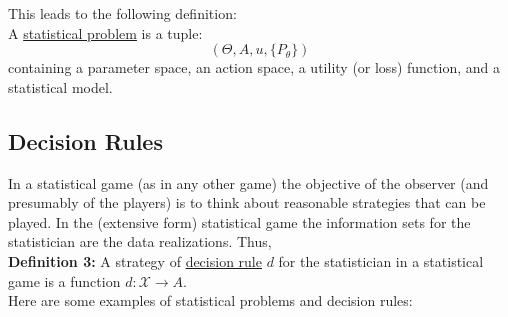 \documentclass[11pt]{article} %
\begin{document}
This leads to the following definition:\\

 A \underline{statistical problem} is a tuple: 
\[(\Theta, A, u, \{P_{\theta}\})\] 
containing a parameter space, an action space, a utility (or loss) function, and a statistical model. \\



\subsection{Decision Rules}



In a statistical game (as in any other game) the objective of the observer (and presumably of the players) is to think about reasonable strategies that can be played. In the (extensive form) statistical game the information sets for the statistician are the data realizations. Thus,\\

\noindent \textbf{Definition 3:} A strategy of \underline{decision rule} $d$ for the statistician in a statistical game is a function $d: \mathcal{X} \rightarrow A$.  \\

Here are some examples of statistical problems and decision rules: 
\end{document}
